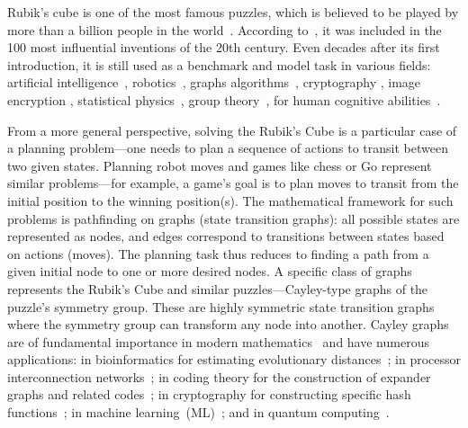 Rubik's cube is one of the most famous puzzles, which is believed to be played by more than a billion people in the world~\cite{rubik2020cubed}. According to~\cite{van2002inventing}, it was included in the 100 most influential inventions of the 20th century. Even decades after its first introduction, it is still used as a benchmark and model task in various fields: 
artificial intelligence~\cite{agostinelli2019solving},
robotics~\cite{openai2019solvingrubikscuberobot},  
graphs algorithms~\cite{korf2008linear, sturtevant2013minimizing}, 
cryptography \cite{petit2013rubik},
image encryption \cite{loukhaoukha2012secure}, 
statistical physics~\cite{chen2014rubik, gower2024saddles}, 
group theory~\cite{joyner2008adventures, cornock2015teaching}, 
for human cognitive abilities~\cite{meinz2023ability}.  


From a more general perspective, solving the Rubik's Cube is a particular case of a planning problem---one needs to plan a sequence of actions to transit between two given states. Planning robot moves and games like chess or Go represent similar problems---for example, a game's goal is to plan moves to transit from the initial position to the winning position(s). The mathematical framework for such problems is pathfinding on graphs (state transition graphs): all possible states are represented as nodes, and edges correspond to transitions between states based on actions (moves). The planning task thus reduces to finding a path from a given initial node to one or more desired nodes. A specific class of graphs represents the Rubik's Cube and similar puzzles---Cayley-type graphs of the puzzle's symmetry group. These are highly symmetric state transition graphs where the symmetry group can transform any node into another.
Cayley graphs are of fundamental importance in modern mathematics~\cite{gromov1993geometric, tao2015expansion} and have numerous applications: in bioinformatics for estimating evolutionary distances~\cite{Pevzner1995human2mice, Pevzner1999cabbage2turnip, wilson2024cayley, bulteau2019parameterized}; in processor interconnection networks~\cite{akers1989group,cooperman1991applications,heydemann1997cayley}; in coding theory for the construction of expander graphs and related codes~\cite{hoory2006expander}; in cryptography for constructing specific hash functions~\cite{zemor1994hash,petit2013rubik}; in machine learning~(ML)~\cite{wilson2024cayley}; and in quantum computing~\cite{ruiz2024quantum,sarkar2024quantum,dinur2023good, acevedo2006exploring, gromada2022some}. 

